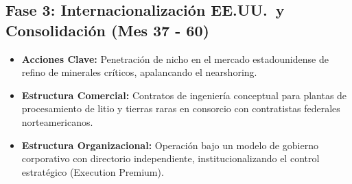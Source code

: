 \subsection{Fase 3: Internacionalización EE.UU.\ y Consolidación (Mes 37 - 60)}
\begin{itemize}
    \item \textbf{Acciones Clave:} Penetración de nicho en el mercado estadounidense de refino de minerales críticos, apalancando el nearshoring.
    \item \textbf{Estructura Comercial:} Contratos de ingeniería conceptual para plantas de procesamiento de litio y tierras raras en consorcio con contratistas federales norteamericanos.
    \item \textbf{Estructura Organizacional:} Operación bajo un modelo de gobierno corporativo con directorio independiente, institucionalizando el control estratégico (Execution Premium).
\end{itemize}

